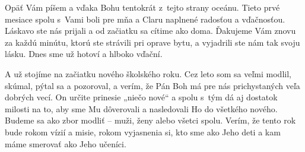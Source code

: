 








Opäť Vám píšem a vďaka Bohu tentokrát z~tejto strany oceánu. Tieto prvé mesiace spolu s~Vami boli pre mňa a Claru naplnené radosťou a vďačnosťou. Láskavo ste nás prijali a od začiatku sa cítime ako doma. Ďakujeme Vám znovu za každú minútu, ktorú ste strávili pri oprave bytu, a vyjadrili ste nám tak svoju lásku. Dnes sme už hotoví a hlboko vďační.

A už stojíme na začiatku nového školského roku. Cez leto som sa veľmi modlil, skúmal, pýtal sa a pozoroval, a verím, že Pán Boh má pre nás prichystaných veľa dobrých vecí. On určite prinesie „niečo nové“ a spolu s~tým dá aj dostatok milosti na to, aby sme Mu dôverovali a nasledovali Ho do všetkého nového. Budeme sa ako zbor modliť -- muži, ženy alebo všetci spolu. Verím, že tento rok bude rokom vízií a misie, rokom vyjasnenia si, kto sme ako Jeho deti a kam máme smerovať ako Jeho učeníci.

